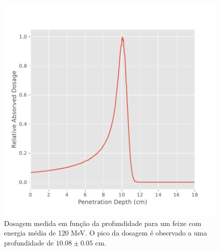 \documentclass[a4paper, 12pt]{article} %
\begin{document}
\begin{figure}[H]
\begin{minipage}[r]{.49\linewidth}
			\includegraphics[width=\linewidth]{bragg_peak_120mev.pdf}
			\caption{Dosagem medida em função da profundidade para um feixe com energia média de 120 MeV. O pico da dosagem é observado a uma profundidade de $10.08 \pm 0.05$ cm.}
			\label{fig:bragg_peak120}
		\end{minipage}
	\end{figure}
\end{document}
